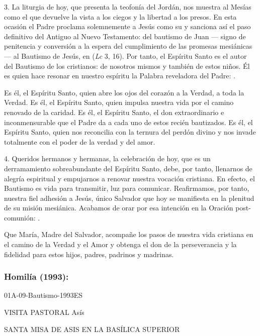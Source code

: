 \begin{body}
	3. La liturgia de hoy, que presenta la teofonía del Jordán, nos muestra al Mesías como el que devuelve la vista a los ciegos y la libertad a los presos. En esta ocasión el Padre proclama solemnemente a Jesús como su  y sanciona así el paso definitivo del Antiguo al Nuevo Testamento: del bautismo de Juan --- signo de penitencia y conversión a la espera del cumplimiento de las promesas mesiánicas --- al Bautismo de Jesús, en  (\emph{Lc} 3, 16). Por tanto, el Espíritu Santo es el autor del Bautismo de los cristianos: de nosotros mismos y también de estos niños. Él es quien hace resonar en nuestro espíritu la Palabra reveladora del Padre: .

	Es él, el Espíritu Santo, quien abre los ojos del corazón a la Verdad, a toda la Verdad. Es él, el Espíritu Santo, quien impulsa nuestra vida por el camino renovado de la caridad. Es él, el Espíritu Santo, el don extraordinario e inconmensurable que el Padre da a cada uno de estos recién bautizados. Es él, el Espíritu Santo, quien nos reconcilia con la ternura del perdón divino y nos invade totalmente con el poder de la verdad y del amor.

	4. Queridos hermanos y hermanas, la celebración de hoy, que es un derramamiento sobreabundante del Espíritu Santo, debe, por tanto, llenarnos de alegría espiritual y empujarnos a renovar nuestra vocación cristiana. En efecto, el Bautismo es vida para transmitir, luz para comunicar. Reafirmamos, por tanto, nuestra fiel adhesión a Jesús, único Salvador que hoy se manifiesta en la plenitud de su misión mesiánica. Acabamos de orar por esa intención en la Oración post-comunión: .

	Que María, Madre del Salvador, acompañe los pasos de nuestra vida cristiana en el camino de la Verdad y el Amor y obtenga el don de la perseverancia y la fidelidad para estos hijos, padres, padrinos y madrinas.

	\subsubsection{Homilía (1993):} 01A-09-Bautismo-1993ES

	VISITA PASTORAL Asís

	SANTA MISA DE ASIS EN LA BASÍLICA SUPERIOR


\end{body}
